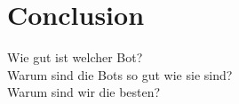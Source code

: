 \chapter{Conclusion}
Wie gut ist welcher Bot?\\
Warum sind die Bots so gut wie sie sind?\\
Warum sind wir die besten?
